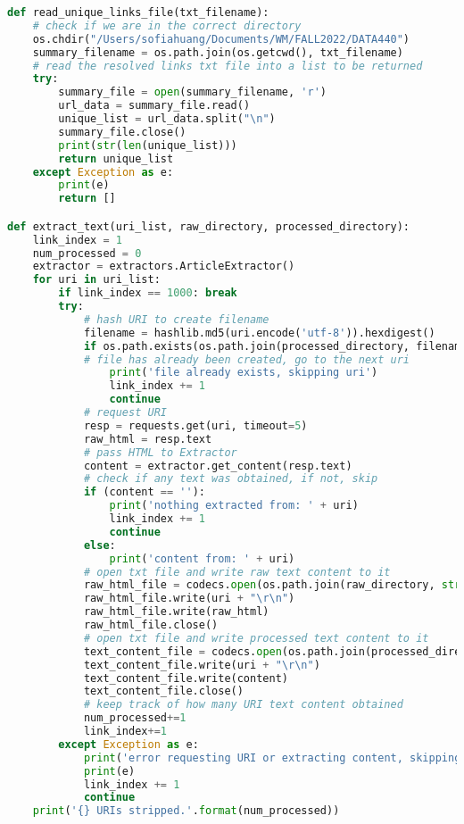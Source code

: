 \documentclass[12pt]{article}
\begin{document}
\begin{lstlisting}[language=Python, caption=Extracting main text content of each webpage, label=lst:copy]
def read_unique_links_file(txt_filename):
    # check if we are in the correct directory
    os.chdir("/Users/sofiahuang/Documents/WM/FALL2022/DATA440")
    summary_filename = os.path.join(os.getcwd(), txt_filename)
    # read the resolved links txt file into a list to be returned
    try:
        summary_file = open(summary_filename, 'r')
        url_data = summary_file.read()
        unique_list = url_data.split("\n")
        summary_file.close()
        print(str(len(unique_list)))
        return unique_list
    except Exception as e:
        print(e)
        return []

def extract_text(uri_list, raw_directory, processed_directory):
    link_index = 1
    num_processed = 0
    extractor = extractors.ArticleExtractor()
    for uri in uri_list:
        if link_index == 1000: break
        try:
            # hash URI to create filename
            filename = hashlib.md5(uri.encode('utf-8')).hexdigest()
            if os.path.exists(os.path.join(processed_directory, filename)):
            # file has already been created, go to the next uri
                print('file already exists, skipping uri')
                link_index += 1
                continue
            # request URI
            resp = requests.get(uri, timeout=5)
            raw_html = resp.text
            # pass HTML to Extractor
            content = extractor.get_content(resp.text)
            # check if any text was obtained, if not, skip
            if (content == ''): 
                print('nothing extracted from: ' + uri)
                link_index += 1
                continue
            else:
                print('content from: ' + uri)
            # open txt file and write raw text content to it
            raw_html_file = codecs.open(os.path.join(raw_directory, str(filename)), "w", encoding='utf8')
            raw_html_file.write(uri + "\r\n")
            raw_html_file.write(raw_html)
            raw_html_file.close()
            # open txt file and write processed text content to it
            text_content_file = codecs.open(os.path.join(processed_directory, str(filename)), "w", encoding='utf8')
            text_content_file.write(uri + "\r\n")
            text_content_file.write(content)
            text_content_file.close()
            # keep track of how many URI text content obtained
            num_processed+=1
            link_index+=1
        except Exception as e:
            print('error requesting URI or extracting content, skipping to next.')
            print(e)
            link_index += 1
            continue
    print('{} URIs stripped.'.format(num_processed))

\end{lstlisting}
\end{document}
